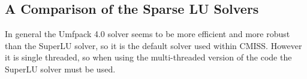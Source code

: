 \subsection{A Comparison of the Sparse LU Solvers}\label{s3.3}

In general the Umfpack 4.0 solver seems to be more efficient and more robust 
than the SuperLU solver, so it is the default solver used within CMISS.
However it is single threaded, so when using the multi-threaded version of 
the code the SuperLU solver must be used.




